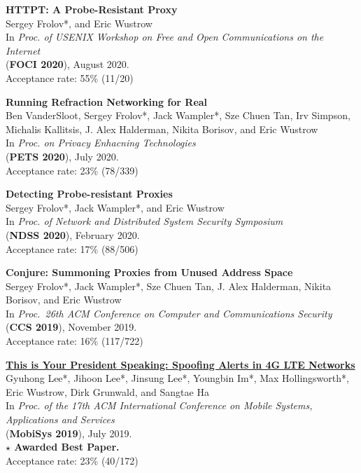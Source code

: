 \documentclass[margin,11pt]{res} %
\begin{document}
    \textbf{HTTPT: A Probe-Resistant Proxy} \\
    Sergey Frolov*, and Eric Wustrow \\
    In \emph{Proc. of USENIX Workshop on Free and Open Communications on the Internet} \\
    (\textbf{FOCI 2020}), August 2020. \\
    Acceptance rate: 55\% (11/20)

    \textbf{Running Refraction Networking for Real} \\
    Ben VanderSloot, Sergey Frolov*, Jack Wampler*, Sze Chuen Tan, Irv Simpson, Michalis Kallitsis, J. Alex Halderman, Nikita Borisov, and Eric Wustrow \\
    In \emph{Proc. on Privacy Enhacning Technologies} \\
    (\textbf{PETS 2020}), July 2020. \\
    Acceptance rate: 23\% (78/339)   %

    \textbf{Detecting Probe-resistant Proxies} \\
    Sergey Frolov*, Jack Wampler*, and Eric Wustrow \\
    In \emph{Proc. of Network and Distributed System Security Symposium} \\
    (\textbf{NDSS 2020}), February 2020. \\
    Acceptance rate: 17\% (88/506)

    \textbf{Conjure: Summoning Proxies from Unused Address Space} \\
    Sergey Frolov*, Jack Wampler*, Sze Chuen Tan, J. Alex Halderman, Nikita Borisov, and Eric Wustrow \\
    In \emph{Proc.\ 26th ACM Conference on Computer and Communications Security} \\
    (\textbf{CCS 2019}), November 2019. \\
    Acceptance rate: 16\% (117/722)

    \textbf{\href{https://ericw.us/trow/lte-alerts.pdf}{This is Your President Speaking: Spoofing Alerts in 4G LTE Networks}} \\
    Gyuhong Lee*, Jihoon Lee*, Jinsung Lee*, Youngbin Im*, Max Hollingsworth*, Eric Wustrow, Dirk Grunwald, and Sangtae Ha \\
    In \emph{Proc. of the 17th ACM International Conference on Mobile Systems, Applications and Services} \\
    (\textbf{MobiSys 2019}), July 2019. \\
    \textbf{$\star$ Awarded Best Paper.} \\
    Acceptance rate: 23\% (40/172)
\end{document}

